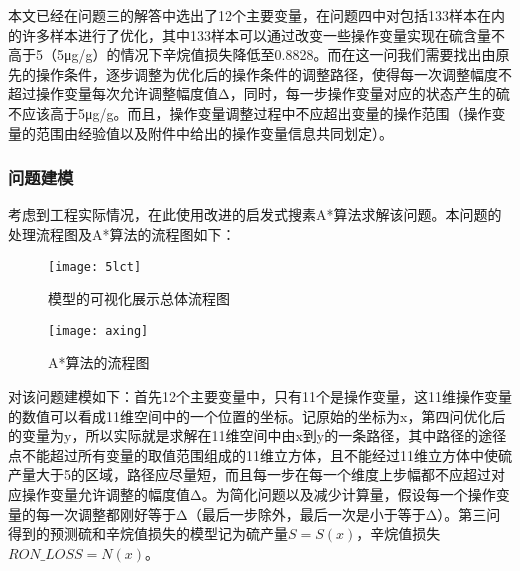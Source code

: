 \documentclass[bwprint]{gmcmthesis}
\begin{document}
本文已经在问题三的解答中选出了12个主要变量，在问题四中对包括133样本在内的许多样本进行了优化，其中133样本可以通过改变一些操作变量实现在硫含量不高于5（5μg/g）的情况下辛烷值损失降低至0.8828。而在这一问我们需要找出由原先的操作条件，逐步调整为优化后的操作条件的调整路径，使得每一次调整幅度不超过操作变量每次允许调整幅度值Δ，同时，每一步操作变量对应的状态产生的硫不应该高于5μg/g。而且，操作变量调整过程中不应超出变量的操作范围（操作变量的范围由经验值以及附件中给出的操作变量信息共同划定）。

\FloatBarrier
\subsubsection{问题建模}
考虑到工程实际情况，在此使用改进的启发式搜素A*算法求解该问题。本问题的处理流程图及A*算法的流程图如下：
\begin{figure}[H]
	\centering
	\texttt{[image: 5lct]}
	\caption{模型的可视化展示总体流程图}
\end{figure}

\begin{figure}[H]
	\centering
	\texttt{[image: axing]}
	\caption{A*算法的流程图}
\end{figure}
对该问题建模如下：首先12个主要变量中，只有11个是操作变量，这11维操作变量的数值可以看成11维空间中的一个位置的坐标。记原始的坐标为x，第四问优化后的变量为y，所以实际就是求解在11维空间中由x到y的一条路径，其中路径的途径点不能超过所有变量的取值范围组成的11维立方体，且不能经过11维立方体中使硫产量大于5的区域，路径应尽量短，而且每一步在每一个维度上步幅都不应超过对应操作变量允许调整的幅度值Δ。为简化问题以及减少计算量，假设每一个操作变量的每一次调整都刚好等于Δ（最后一步除外，最后一次是小于等于Δ）。第三问得到的预测硫和辛烷值损失的模型记为硫产量$S=S(x)$，辛烷值损失$RON\_LOSS=N(x)$。


\FloatBarrier
\end{document}
